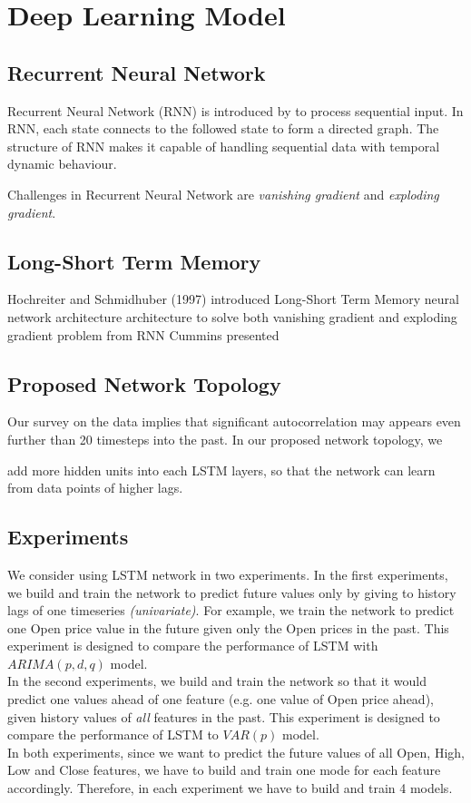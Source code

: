 \documentclass[11pt]{article}
\begin{document}

\section{Deep Learning Model}
\subsection{Recurrent Neural Network}
Recurrent Neural Network (RNN) is introduced by \cite{rumelhart1988learning} to
process sequential input. In RNN, each state connects to the followed state to
form a directed graph. The structure of RNN makes it capable of handling
sequential data with temporal dynamic behaviour.

Challenges in Recurrent Neural Network are \textit{vanishing gradient} and
\textit{exploding gradient}.

\subsection{Long-Short Term Memory}
Hochreiter and Schmidhuber (1997) \cite{gers1999learning} introduced Long-Short
Term Memory neural network architecture architecture to solve both vanishing
gradient and exploding gradient problem from RNN Cummins presented

\subsection{Proposed Network Topology}
Our survey on the data implies that significant autocorrelation may appears even
further than 20 timesteps into the past. In our proposed network topology, we

add more hidden units into each LSTM layers, so that the network can learn from
data points of higher lags.

\subsection{Experiments}
We consider using LSTM network in two experiments. In the first experiments, we
build and train the network to predict future values only by giving to history
lags of one timeseries \textit{(univariate)}. For example, we train the network to
predict one Open price value in the future given only the Open prices in the
past. This experiment is designed to compare the performance of LSTM with
$ARIMA(p, d, q)$ model.\\ 
In the second experiments, we build and train the network so that it would
predict one values ahead of one feature (e.g. one value of Open price ahead),
given history values of \textit{all} features in the past. This experiment is
designed to compare the performance of LSTM to $VAR(p)$ model.\\
In both experiments, since we want to predict the future values of all Open,
High, Low and Close features, we have to build and train one mode for each
feature accordingly. Therefore, in each experiment we have to build and train 4
models.
\end{document}
